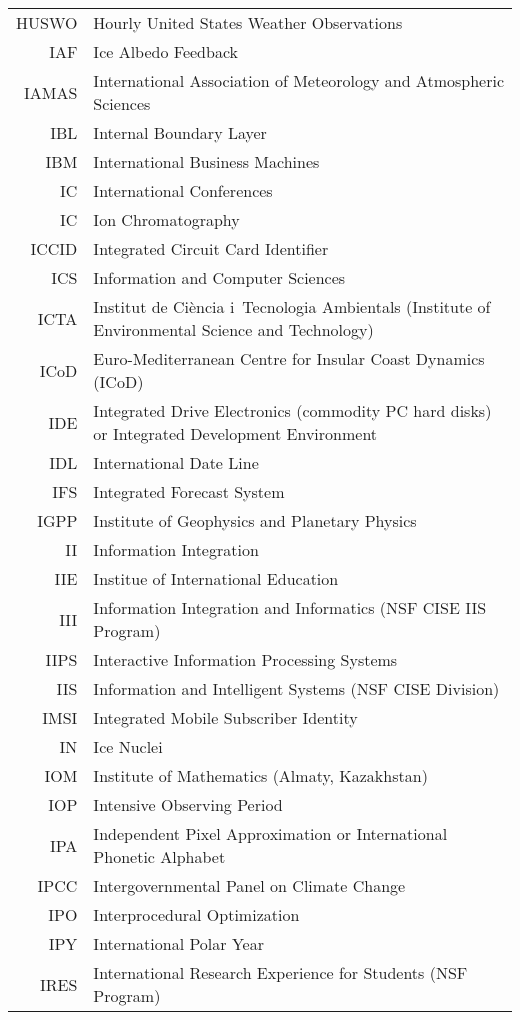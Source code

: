\documentclass[12pt,twoside]{article}
\begin{document}
\begin{longtable}[>{\bfseries}l]{>{\ttfamily}r l}
HUSWO & Hourly United States Weather Observations \\
IAF & Ice Albedo Feedback \\
IAMAS & International Association of Meteorology and Atmospheric Sciences \\
IBL & Internal Boundary Layer \\
IBM & International Business Machines \\
IC & International Conferences \\
IC & Ion Chromatography \\
ICCID & Integrated Circuit Card Identifier \\
ICS & Information and Computer Sciences \\
ICTA & Institut de Ci\`{e}ncia i~Tecnologia Ambientals (Institute of Environmental Science and Technology) \\
ICoD & Euro-Mediterranean Centre for Insular Coast Dynamics (ICoD) \\
IDE & Integrated Drive Electronics (commodity PC hard disks) or Integrated Development Environment \\
IDL & International Date Line \\
IFS & Integrated Forecast System \\
IGPP & Institute of Geophysics and Planetary Physics \\
II & Information Integration \\
IIE & Institue of International Education \\
III & Information Integration and Informatics (NSF CISE IIS Program) \\
IIPS & Interactive Information Processing Systems \\
IIS & Information and Intelligent Systems (NSF CISE Division) \\
IMSI & Integrated Mobile Subscriber Identity \\
IN & Ice Nuclei \\
IOM & Institute of Mathematics (Almaty, Kazakhstan) \\
IOP & Intensive Observing Period \\
IPA & Independent Pixel Approximation or International Phonetic Alphabet \\
IPCC & Intergovernmental Panel on Climate Change \\
IPO & Interprocedural Optimization \\
IPY & International Polar Year \\
IRES & International Research Experience for Students (NSF Program) \\

\end{longtable}
\end{document}
